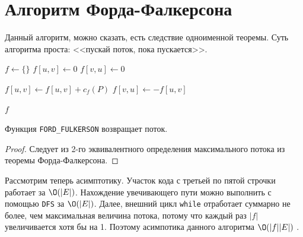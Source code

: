 \section{Алгоритм Форда-Фалкерсона}

Данный алгоритм, можно сказать, есть следствие одноименной теоремы. Суть алгоритма проста: <<пускай поток, пока пускается>>.


\begin{algorithm}[H]
\caption{Алгоритм Прима}
\begin{algorithmic}[1]

    \State $f \gets \{\}$
        \State $f[u, v] \gets 0$
        \State $f[v, u] \gets 0$
    \EndFor

            \State $f[u, v] \gets f[u, v] + c_f(P)$
            \State $f[v, u] \gets -f[u, v]$
        \EndFor
    \EndWhile

    \State \Return $f$
\EndFunction
\end{algorithmic}
\end{algorithm}

\St Функция \texttt{FORD\_FULKERSON} возвращает поток.
\begin{proof}
    
    Следует из 2-го эквивалентного определения максимального потока из теоремы Форда-Фалкерсона.

\end{proof}

Рассмотрим теперь асимптотику. Участок кода с третьей по пятой строчки работает за $\O(|E|)$. Нахождение увечивающего пути можно выполнить с помощью \texttt{DFS} за $\O(|E|)$. 
Далее, внешний цикл \texttt{while} отработает суммарно не более, чем максимальная величина потока, потому что каждый раз $|f|$ увеличивается хотя бы на 1.
Поэтому асимпотика данного алгоритма $\O(|f| |E|)$ .
